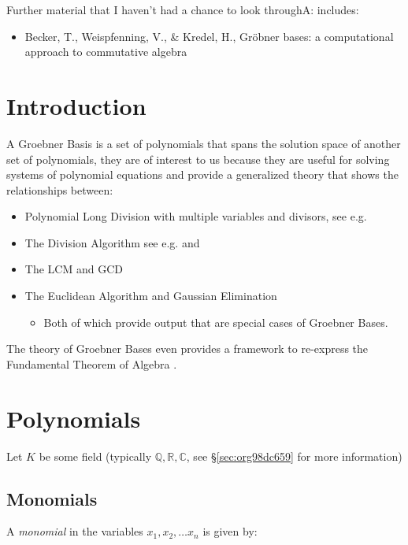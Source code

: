 \documentclass[a4paper,11pt,twoside]{article}
\begin{document}
Further material that I haven't had a chance to look throughA:
includes:

\begin{itemize}
\item Becker, T., Weispfenning, V., \& Kredel, H., Gröbner bases: a computational approach to commutative algebra \cite{beckerGrobnerBasesComputational1993}
\end{itemize}

\section{Introduction}
\label{sec:org2d2080f}
A Groebner Basis is a set of polynomials that spans the solution
space of another set of polynomials, they are of interest to us
because they are useful for solving systems of polynomial equations
and provide a generalized theory that shows the relationships between: 

\begin{itemize}
\item Polynomial Long Division with multiple variables and divisors,
see e.g. \cite[\S 3]{coxIdealsVarietiesAlgorithms1997}
\item The Division Algorithm see
e.g. \cite[\S 3]{coxIdealsVarietiesAlgorithms1997} and \cite{nicodemiIntroductionAbstractAlgebra2007a}
\item The LCM and GCD \cite[\S 2.6]{coxIdealsVarietiesAlgorithms1997}
\item The Euclidean Algorithm and Gaussian Elimination
\begin{itemize}
\item Both of which provide output that are special cases of
Groebner Bases.
\end{itemize}
\end{itemize}

The theory of Groebner Bases even provides a framework to
re-express the Fundamental Theorem of Algebra \cite{sturmfelsSolvingSystemsPolynomial2002}.
\section{Polynomials}
\label{sec:orgf371222}
Let \(K\) be some field (typically \(\mathbb{Q}, \mathbb{R},
\mathbb{C}\), see \S \ref{sec:org98dc659} for more information)

\subsection{Monomials}
\label{sec:org4511c6d}
A \emph{monomial} in the variables \(x_1, x_2, \ldots x_n\) is given by: \cite[p. 3]{hibiGrobnerBasesStatistics2014}
\end{document}
